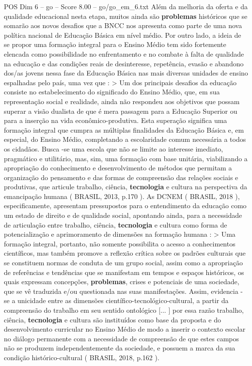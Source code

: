 \begin{textsample}{POS Dim 6 – go – Score 8.00 – go/go\_em\_6.txt}
Além da melhoria da oferta e da qualidade educacional nesta etapa, muitos ainda são \textbf{problemas} históricos que se somarão aos novos desafios que a BNCC nos apresenta como parte de uma nova política nacional de Educação Básica em nível médio.
Por outro lado, a ideia de se propor uma formação integral para o Ensino Médio tem sido fortemente elencada como possibilidade no enfrentamento e no combate à falta de qualidade na educação e das condições reais de desinteresse, repetência, evasão e abandono dos/as jovens nessa fase da Educação Básica nas mais diversas unidades de ensino espalhadas pelo país, uma vez que : > Um dos principais desafios da educação consiste no estabelecimento do significado do Ensino Médio, que, em sua representação social e realidade, ainda não respondeu aos objetivos que possam superar a visão dualista de que é mera passagem para a Educação Superior ou para a inserção na vida econômico-produtiva.
Esta superação significa uma formação integral que cumpra as múltiplas finalidades da Educação Básica e, em especial, do Ensino Médio, completando a escolaridade comum necessária a todos os cidadãos.
Busca -se uma escola que não se limite ao interesse imediato, pragmático e utilitário, mas, sim, uma formação com base unitária, viabilizando a apropriação do conhecimento e desenvolvimento de métodos que permitam a organização do pensamento e das formas de compreensão das relações sociais e produtivas, que articule trabalho, ciência, \textbf{tecnologia} e cultura na perspectiva da emancipação humana ( BRASIL, 2013, p.170 ).
As DCNEM ( BRASIL, 2018 ), especificamente, apresentam pressupostos para o entendimento da educação como um estado de direito e de qualidade social, apontando ainda, para a necessidade de articulação entre trabalho, ciência, \textbf{tecnologia} e cultura como forma de potencialização e aprimoramento de dimensões na formação humana : > Uma formação integral, portanto, não somente possibilita o acesso a conhecimentos científicos, mas também promove a reflexão crítica sobre os padrões culturais que se constituem normas de conduta de um grupo social, assim como a apropriação de referências e tendências que se manifestam em tempos e espaços históricos, os quais expressam concepções, \textbf{problemas}, crises e potenciais de uma sociedade, que se vê traduzida e/ou questionada nas suas manifestações.
Assim, evidencia -se a unicidade entre as dimensões científico-tecnológico-cultural, a partir da compreensão do trabalho em seu sentido ontológico [... ] por essa razão trabalho, ciência, \textbf{tecnologia} e cultura são instituídos como base da proposta e do desenvolvimento curricular no Ensino Médio de modo a inserir o contexto escolar no diálogo permanente com a necessidade de compreensão de que estes campos não se produzem independentemente da sociedade, e possuem a marca da sua condição histórico-cultural ( BRASIL, 2018, p.162 ).

\end{textsample}
